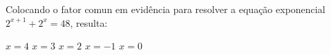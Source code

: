 Colocando o fator comun em evidência para resolver a equação exponencial $2^{x+1}+2^x=48$, resulta:

$x=4$
$x=3$
$x=2$
$x=-1$
$x=0$



